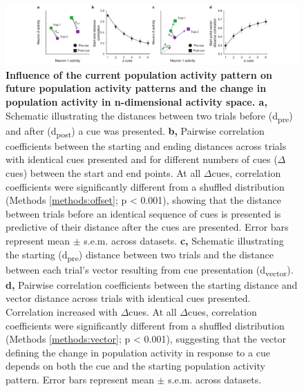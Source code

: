 \begin{figure}
\includegraphics[width=1.1\textwidth,center]{figures/fig_3_10.pdf}
\caption[Influence of the current population activity pattern on future population activity patterns and the change in population activity in n-dimensional activity space.]
{\textbf{Influence of the current population activity pattern on future population activity patterns and the change in population activity in n-dimensional activity space. a,} Schematic illustrating the distances between two trials before (d\textsubscript{pre}) and after (d\textsubscript{post}) a cue was presented. \textbf{b,} Pairwise correlation coefficients between the starting and ending distances across trials with identical cues presented and for different numbers of cues ($\Delta$cues) between the start and end points. At all $\Delta$cues, correlation coefficients were significantly different from a shuffled distribution (Methods \ref{methods:offset}; p < 0.001), showing that the distance between trials before an identical sequence of cues is presented is predictive of their distance after the cues are presented. Error bars represent mean $\pm$ s.e.m. across datasets. \textbf{c,} Schematic illustrating the starting (d\textsubscript{pre}) distance between two trials and the distance between each trial’s vector resulting from cue presentation (d\textsubscript{vector}). \textbf{d,} Pairwise correlation coefficients between the starting distance and vector distance across trials with identical cues presented.  Correlation increased with $\Delta$cues. At all $\Delta$cues, correlation coefficients were significantly different from a shuffled distribution (Methods \ref{methods:vector}; p < 0.001), suggesting that the vector defining the change in population activity in response to a cue depends on both the cue and the starting population activity pattern. Error bars represent mean $\pm$ s.e.m. across datasets.
\label{fig:3_10}}
\end{figure} 


